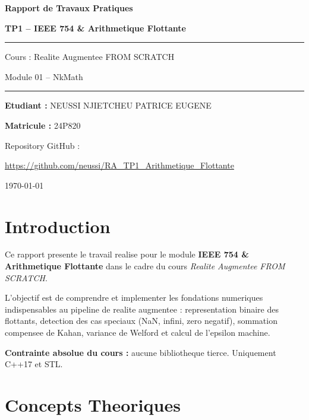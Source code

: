 \documentclass[12pt,a4paper]{article}
\begin{document}
\begin{titlepage}
    \centering
    \vspace*{2cm}
    {\huge\bfseries Rapport de Travaux Pratiques\par}
    \vspace{1cm}
    {\LARGE\bfseries\color{codeblue} TP1 -- IEEE 754 \& Arithmetique Flottante\par}
    \vspace{1.5cm}
    \rule{\linewidth}{0.5pt}
    \vspace{0.5cm}
    {\large Cours : Realite Augmentee FROM SCRATCH\par}
    {\large Module 01 -- NkMath\par}
    \vspace{0.5cm}
    \rule{\linewidth}{0.5pt}
    \vspace{2cm}
    {\large\textbf{Etudiant :} NEUSSI NJIETCHEU PATRICE EUGENE\par}
    {\large\textbf{Matricule :} 24P820\par}
    \vspace{2cm}
    {\large Repository GitHub :\par}
    \href{https://github.com/neussi/RA_TP1_Arithmetique_Flottante}{https://github.com/neussi/RA\_TP1\_Arithmetique\_Flottante}
    \vfill
    {\large \today\par}
\end{titlepage}

\tableofcontents
\newpage

\section{Introduction}

Ce rapport presente le travail realise pour le module \textbf{IEEE 754 \& Arithmetique Flottante}
dans le cadre du cours \textit{Realite Augmentee FROM SCRATCH}.

L'objectif est de comprendre et implementer les fondations numeriques indispensables au pipeline
de realite augmentee : representation binaire des flottants, detection des cas speciaux (NaN, infini,
zero negatif), sommation compensee de Kahan, variance de Welford et calcul de l'epsilon machine.

\textbf{Contrainte absolue du cours :} aucune bibliotheque tierce. Uniquement C++17 et STL.

\section{Concepts Theoriques}
\end{document}
